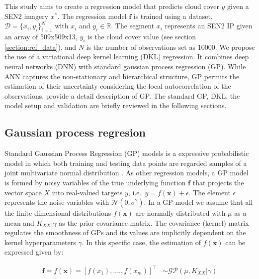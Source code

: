 \documentclass[a4paper, nobind]{templates/cdethesis}
\begin{document}
This study aims to create a regression model that predicts cloud cover \(y\) given a SEN2 imagery \(x^*\). The regression model \(\mathbf{f}\) is trained using a dataset, \(\mathcal{D} = \{x_i, y_i\}^{N}_{i=1}\) with \(x_i\) and \(y_i \in \mathbb{R}\). The segment \(x_i\) represents an SEN2 IP given an array of
509x509x13, \(y_i\) is the cloud cover value (see section \ref{section:ref_data}), and \(N\) is the number of observations set as 10000. We propose the use of a variational deep kernel learning (DKL) regression. It combines deep neural networks (DNN) with standard gaussian process regression (GP). While ANN captures the non-stationary and hierarchical structure, GP permits the estimation of their uncertainty considering the local autocorrelation of the observations. \cite{rasmussen2003gaussian} provide a detail description of GP. The standard GP, DKL, the model setup and validation are briefly reviewed in the following sections.

\subsection{Gaussian process regresion}

Standard Gaussian Process Regression (GP) models is a expressive probabilistic model in which both training and testing data points are regarded samples of a joint multivariate normal distribution \cite{williams2006gaussian}. As other regression models, a GP model is formed by noisy variables of the true underlying function \(\mathbf{f}\) that projects the vector space \(X\) into real-valued targets \(y\), i.e.~\(y = f(\mathbf{x}) + \epsilon\). The element \(\epsilon\) represents the noise variables with \(\mathcal{N}(0, \sigma^{2})\). In a GP model we assume that all the finite dimensional distributions \(f(\mathbf{x})\) are normally distributed with \(\mu\) as a mean and \(K_{XX}|\gamma\) as the prior covariance matrix. The covariance (kernel) matrix regulates the smoothness of GPs and its values are implicitly dependent on the kernel hyperparameters \(\gamma\). In this specific case, the estimation of \(f(\mathbf{x})\) can be expressed given by:

\begin{equation}
\begin{aligned}
\mathbf{f} = f(\mathbf{x}) = [f(x_1), ...., f(x_m)]^\top & \sim 
\mathcal{GP}\left(
  \mu, K_{XX}|\gamma\right
) \\
\end{aligned} \label{eq:1}
\end{equation}
\end{document}
